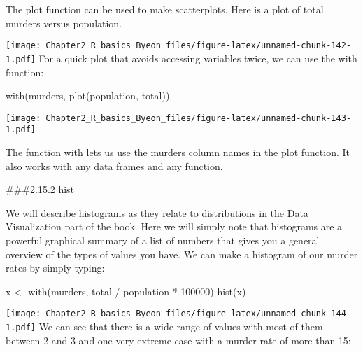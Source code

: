 \documentclass[
]{article}
\newenvironment{Shaded}{\begin{snugshade}}{\end{snugshade}}
\newcommand{\DecValTok}[1]{\textcolor[rgb]{0.00,0.00,0.81}{#1}}
\newcommand{\FunctionTok}[1]{\textcolor[rgb]{0.00,0.00,0.00}{#1}}
\newcommand{\NormalTok}[1]{#1}
\newcommand{\OtherTok}[1]{\textcolor[rgb]{0.56,0.35,0.01}{#1}}
\newcommand{\SpecialCharTok}[1]{\textcolor[rgb]{0.00,0.00,0.00}{#1}}
\begin{document}
The plot function can be used to make scatterplots. Here is a plot of
total murders versus population.

\begin{Shaded}
\end{Shaded}

\texttt{[image: Chapter2\_R\_basics\_Byeon\_files/figure-latex/unnamed-chunk-142-1.pdf]}
For a quick plot that avoids accessing variables twice, we can use the
with function:

\begin{Shaded}
\begin{Highlighting}[]
\FunctionTok{with}\NormalTok{(murders, }\FunctionTok{plot}\NormalTok{(population, total))}
\end{Highlighting}
\end{Shaded}

\texttt{[image: Chapter2\_R\_basics\_Byeon\_files/figure-latex/unnamed-chunk-143-1.pdf]}

The function with lets us use the murders column names in the plot
function. It also works with any data frames and any function.

\#\#\#2.15.2 hist

We will describe histograms as they relate to distributions in the Data
Visualization part of the book. Here we will simply note that histograms
are a powerful graphical summary of a list of numbers that gives you a
general overview of the types of values you have. We can make a
histogram of our murder rates by simply typing:

\begin{Shaded}
\begin{Highlighting}[]
\NormalTok{x }\OtherTok{\textless{}{-}} \FunctionTok{with}\NormalTok{(murders, total }\SpecialCharTok{/}\NormalTok{ population }\SpecialCharTok{*} \DecValTok{100000}\NormalTok{)}
\FunctionTok{hist}\NormalTok{(x)}
\end{Highlighting}
\end{Shaded}

\texttt{[image: Chapter2\_R\_basics\_Byeon\_files/figure-latex/unnamed-chunk-144-1.pdf]}
We can see that there is a wide range of values with most of them
between 2 and 3 and one very extreme case with a murder rate of more
than 15:
\end{document}

